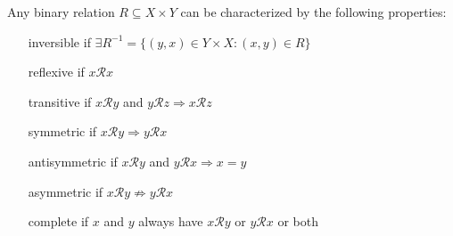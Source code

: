Any binary relation $R\subseteq X\times Y$ can be characterized by the following properties:
\begin{definition}
    \begin{enumerate}
        \item[inversible] if $\exists R^{-1}=\{(y,x)\in Y\times X:(x,y)\in R\}$
        \item[reflexive] if $x\mathcal{R}x$
        \item[transitive] if $x\mathcal{R}y$ and $y\mathcal{R}z \Rightarrow x\mathcal{R}z$
        \item[symmetric] if $x\mathcal{R}y\Rightarrow y\mathcal{R}x$
        \item[antisymmetric] if $x\mathcal{R}y$ and $y\mathcal{R}x \Rightarrow x=y$
        \item[asymmetric] if $x\mathcal{R}y \nRightarrow y\mathcal{R}x$
        \item[complete] if $x$ and $y$ always have $x\mathcal{R}y$ or $y\mathcal{R}x$ or both    
    \end{enumerate}
\end{definition}

